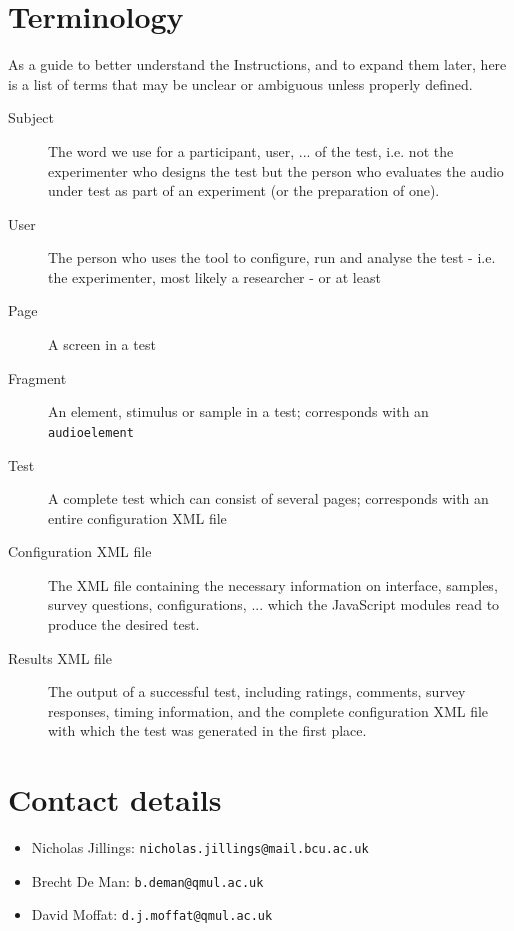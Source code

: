 \documentclass[11pt, oneside]{article}   	%
\begin{document}
\section{Terminology} %
	As a guide to better understand the Instructions, and to expand them later, here is a list of terms that may be unclear or ambiguous unless properly defined. 
	\begin{description}
		\item[Subject] The word we use for a participant, user, ... of the test, i.e. not the experimenter who designs the test but the person who evaluates the audio under test as part of an experiment (or the preparation of one). 
		\item[User] The person who uses the tool to configure, run and analyse the test - i.e. the experimenter, most likely a researcher - or at least 
		\item[Page] A screen in a test
		\item[Fragment] An element, stimulus or sample in a test; corresponds with an \texttt{audioelement}
		\item[Test] A complete test which can consist of several pages; corresponds with an entire configuration XML file
		\item[Configuration XML file] The XML file containing the necessary information on interface, samples, survey questions, configurations, ... which the JavaScript modules read to produce the desired test.
		\item[Results XML file] The output of a successful test, including ratings, comments, survey responses, timing information, and the complete configuration XML file with which the test was generated in the first place. 
	\end{description}

\clearpage

\setcounter{secnumdepth}{0} %
\section{Contact details} %
\label{sec:contact}

	\begin{itemize}
		\item Nicholas Jillings: \texttt{nicholas.jillings@mail.bcu.ac.uk}
		\item Brecht De Man: \texttt{b.deman@qmul.ac.uk}
		\item David Moffat: \texttt{d.j.moffat@qmul.ac.uk}
	\end{itemize}
\end{document}
